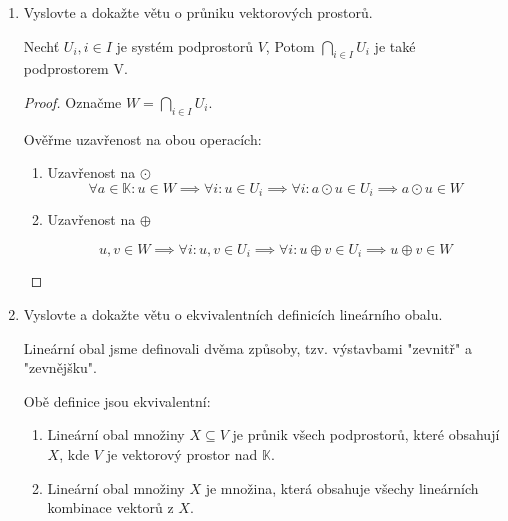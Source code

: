 \documentclass[10pt,a4paper]{article}
\begin{document}
\begin{enumerate}
\begin{proof}
$f_a$ je prosté $\implies$ je na $\implies$ je bijekcí.

Potom 

\begin{equation*}
\prod_{i=1}^{p-1} i = \prod_{i=1}^{p-1} f_a(a) = \prod_{i=1}^{p-1} a\cdot i = a^{p-1} \prod_{i=1}^{p-1} i  \implies a^{p-1} = 1
\end{equation*}
\end{proof}


\item Vyslovte a dokažte větu o průniku vektorových prostorů.

Nechť $U_i, i \in I$ je systém podprostorů $V$, Potom $\displaystyle \bigcap_{i \in I} U_i$ je také podprostorem V.

\begin{proof}
Označme $W = \displaystyle \bigcap_{i \in I} U_i$.

Ověřme uzavřenost na obou operacích:
\begin{enumerate}
\item Uzavřenost na $\odot$
\begin{equation*}	
\forall a \in \mathbb{K}: u \in W \implies \forall i: u \in U_i \implies \forall i: a \odot u \in U_i \implies a \odot u \in W	
\end{equation*}

\item Uzavřenost na $\oplus$

\begin{equation*}
u, v \in W \implies \forall i: u,v \in U_i \implies \forall i: u\oplus v \in U_i \implies u\oplus v \in W
\end{equation*}
\end{enumerate}

\end{proof}


\item Vyslovte a dokažte větu o ekvivalentních definicích lineárního obalu.

Lineární obal jsme definovali dvěma způsoby, tzv. výstavbami "zevnitř" a "zevnějšku".

Obě definice jsou ekvivalentní:

\begin{enumerate}[label=\arabic*]
\item Lineární obal množiny $X \subseteq V$ je průnik všech podprostorů, které obsahují $X$, kde $V$ je vektorový prostor nad $\mathbb{K}$.
\item Lineární obal množiny $X$ je množina, která obsahuje všechy lineárních kombinace vektorů z $X$.
\end{enumerate}


\end{enumerate}
\end{document}
